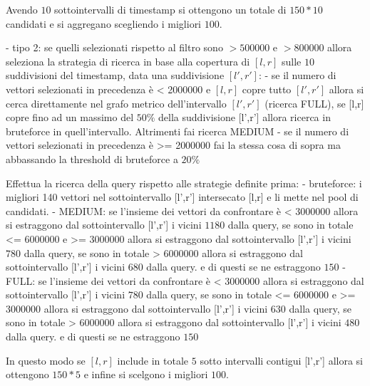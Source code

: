  Avendo $10$ sottointervalli di timestamp si ottengono un totale di $150*10$ candidati 
 e si aggregano scegliendo i migliori $100$.
 
- tipo 2: se quelli selezionati rispetto al filtro sono $> 500000$ e $> 800000$ allora 
 seleziona la strategia di ricerca in base alla copertura di $[l,r]$ sulle $10$ 
 suddivisioni del timestamp, data una suddivisione $[l',r']$:
    - se il numero di vettori selezionati in precedenza è < 2000000 e $[l,r]$ copre 
    tutto $[l',r']$ allora si cerca direttamente nel grafo metrico dell'intervallo $[l',r']$ (ricerca FULL),
    se [l,r] copre fino ad un massimo del $50\%$ della suddivisione [l',r'] allora 
    ricerca in bruteforce in quell'intervallo. Altrimenti fai ricerca MEDIUM
    - se il numero di vettori selezionati in precedenza è >= 2000000 fai la stessa 
    cosa di sopra ma abbassando la threshold di bruteforce a  $20\%$

  Effettua la ricerca della query rispetto alle strategie definite prima:
    - bruteforce: i migliori 140 vettori nel sottointervallo [l',r'] intersecato [l,r]
    e li mette nel pool di candidati.
    - MEDIUM: se l'insieme dei vettori da confrontare è < 3000000 allora si estraggono 
    dal sottointervallo [l',r'] i vicini $1180$ dalla query, se sono in totale <= 6000000 e >=  3000000
    allora si estraggono dal sottointervallo [l',r'] i vicini $780$ dalla query, 
    se sono in totale > 6000000 allora si estraggono dal sottointervallo [l',r'] i vicini $680$ dalla query.
    e di questi se ne estraggono $150$
    - FULL: se l'insieme dei vettori da confrontare è < 3000000 allora si estraggono 
    dal sottointervallo [l',r'] i vicini $780$ dalla query, se sono in totale <= 6000000 e >=  3000000
    allora si estraggono dal sottointervallo [l',r'] i vicini $630$ dalla query, 
    se sono in totale > 6000000 allora si estraggono dal sottointervallo [l',r'] i vicini $480$ dalla query.
    e di questi se ne estraggono $150$
  
  In questo modo se $[l,r]$ include in totale $5$ sotto intervalli contigui [l',r']
  allora si ottengono $150*5$ e infine si scelgono i migliori $100$.
